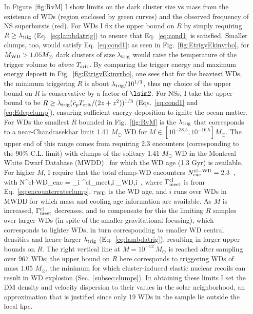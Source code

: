 \documentclass[
    twocolumn,
	prd,
        amssymb,
	preprintnumbers,
	secnumarabic,
	nofootinbib,
	superscriptaddress]{revtex4-1}
\begin{document}
In Figure~\ref{fig:RvM} I show limits on the dark cluster size vs mass from the existence of WDs (region enclosed by green curves) and the observed frequency of NS superbursts (red).
For WDs I fix the upper bound on $R$ by simply requiring $R \geq \lambda_{\rm trig}$ (Eq.~\eqref{eq:lambdatrig}) to ensure that Eq.~\eqref{eq:cond1} is satisfied.
Smaller clumps, too, would satisfy Eq.~\eqref{eq:cond1}: as seen in Fig.~\ref{fig:EtrigvEkinvrho}, for $M_{\rm WD} > 1.05 M_\odot$ dark clusters of size $\lambda_{\rm trig}$ would raise the temperature of the trigger volume to {\em above} $T_{\rm crit}$.
By comparing the trigger energy and maximum energy deposit in Fig.~\ref{fig:EtrigvEkinvrho}, one sees that for the heaviest WDs, the minimum triggering $R$ is about $\lambda_{\rm trig}/10^{1/3}$, thus my choice of the upper bound on $R$ is conservative by a factor of $\lsim 2$. 
For NSs, I take the upper bound to be $R \geq \lambda_{\rm trig}(\bar c_p T_{\rm crit}/(2 z + z^2))^{1/3}$ (Eqs.~\eqref{eq:cond1} and \eqref{eq:Edepclump}), ensuring sufficient energy deposition to ignite the ocean matter.
For WDs the smallest $R$ bounded in Fig.~\ref{fig:RvM} is the $\lambda_{\rm trig}$ that corresponds to a near-Chandrasekhar limit 1.41 $M_\odot$ WD for $M \in [10^{-38.5}, 10^{-16.5}] M_\odot$.
The upper end of this range comes from requiring 2.3 encounters (corresponding to the 90\% C.L. limit) with clumps of the solitary 1.41 $M_\odot$ WD in the Montreal White Dwarf Database (MWDD)~\cite{MontrealWDDatabase} for which the WD age (1.3 Gyr) is available.  
For higher $M$, I require that the total clump-WD encounters $N^{\rm cl-WD}_{\rm enc} = 2.3$~, with
\beq
N^{\rm cl-WD}_{\rm enc} = \sum_i \Gamma^{\rm cl}_{{\rm meet},i} \tau_{{\rm WD},i}~,
\label{eq:Nenc}
\eeq
where $\Gamma^{\rm cl}_{\rm meet}$ is from Eq.~\eqref{eq:encounterrateclump},
$\tau_{\rm WD}$ is the WD age, and $i$ runs over WDs in MWDD for which mass and cooling age information are available.
As $M$ is increased, $\Gamma^{\rm cl}_{\rm meet}$ decreases, and to compensate for this the limiting $R$ samples over larger WDs (in spite of the smaller gravitational focusing), which corresponds to lighter WDs, in turn corresponding to smaller WD central densities and hence larger $\lambda_{\rm trig}$ (Eq.~\eqref{eq:lambdatrig}), resulting in larger upper bounds on $R$.   
The right vertical line at $M = 10^{-12}~M_\odot$ is reached after sampling over 967 WDs; the upper bound on $R$ here corresponds to triggering WDs of mass 1.05 $M_\odot$, the minimum for which cluster-induced elastic nuclear recoils can result in WD explosion (Sec.~\ref{subsec:clumps}).
In obtaining these limits I set the DM density and velocity dispersion to their values in the solar neighborhood, an approximation that is justified since only 19 WDs in the sample lie outside the local kpc. 
 
\end{document}

